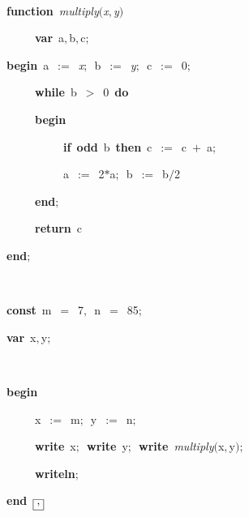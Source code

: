 
\fboxsep=0pt
\def\insert#1{$\fbox{#1}$}
\def\delete#1{$\fboxrule=.5mm\fbox{#1}$}
\rm
\ \par
{\bf function}\ {\it multiply}$(${\sl x}$,${\sl y}$)$\ \par
\ \ \ \ \ {\bf var}\ a$,$b$,$c$;$\ \par
{\bf begin}\ a\ $:=$\ {\sl x}$;$\ b\ $:=$\ {\sl y}$;$\ c\ $:=$\ 0$;$\ \par
\ \ \ \ \ {\bf while}\ b\ $>$\ 0\ {\bf do}\ \par
\ \ \ \ \ {\bf begin}\ \par
\ \ \ \ \ \ \ \ \ \ {\bf if}\ {\bf odd}\ b\ {\bf then}\ c\ $:=$\ c\ $+$\ a$;$\ \par
\ \ \ \ \ \ \ \ \ \ a\ $:=$\ 2$*$a$;$\ b\ $:=$\ b$/$2\ \par
\ \ \ \ \ {\bf end}$;$\ \par
\ \ \ \ \ {\bf return}\ c\ \par
{\bf end}$;$\ \par
\ \par
{\bf const}\ {\sf m}\ $=$\ 7$,$\ {\sf n}\ $=$\ 85$;$\ \par
{\bf var}\ x$,$y$;$\ \par
\ \par
{\bf begin}\ \par
\ \ \ \ \ x\ $:=$\ {\sf m}$;$\ y\ $:=$\ {\sf n}$;$\ \par
\ \ \ \ \ {\bf write}\ x$;$\ {\bf write}\ y$;$\ {\bf write}\ {\it multiply}$($x$,$y$)$$;$\ \par
\ \ \ \ \ {\bf writeln}$;$\ \par
{\bf end}\ \insert{$,$}

